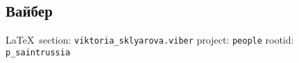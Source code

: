  
 
\subsection{Вайбер}
  
\vspace{0.5cm}
{\small\LaTeX~section: \verb|viktoria_sklyarova.viber| project: \verb|people| rootid: \verb|p_saintrussia|}
\vspace{0.5cm}

  

